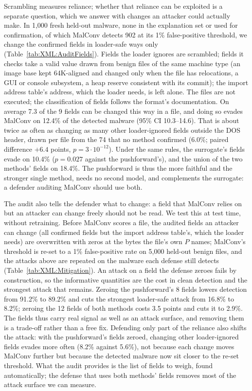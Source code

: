 Scrambling measures reliance; whether that reliance can be exploited is a separate question, which we answer with
changes an attacker could actually make. In 1{,}000 fresh held-out malware, none in the explanation set or used for
confirmation, of which MalConv detects 902 at its 1\% false-positive threshold, we change the confirmed fields in
loader-safe ways only (Table~\ref{tab:XML:AuditFields}). Fields the loader ignores are scrambled; fields it checks
take a valid value drawn from benign files of the same machine type (an image base kept 64K-aligned and changed only
when the file has relocations, a GUI or console subsystem, a heap reserve consistent with its commit); the import
address table's address, which the loader needs, is left alone. The files are not executed; the classification of
fields follows the format's documentation. On average 7.3 of the 9 fields can be changed this way in a file, and doing
so evades MalConv on 12.4\% of the detected malware (95\% CI 10.3--14.6). That is about twice as often as changing as
many other loader-ignored fields outside the DOS header, drawn per file from the 74 that no method confirmed (6.0\%;
paired difference $+6.4$ points, $p = 3 \cdot 10^{-12}$). Under the same rules, the surrogate's fields
evade on 10.4\% ($p = 0.027$ against the pushforward's), and the union of the two methods' fields on 18.4\%. The
pushforward is thus the more faithful and the stronger single method, needs no second model, and complements the
surrogate: a defender auditing MalConv should use both.

The audit also tells the defender what to change: a field that MalConv relies on but an attacker can change freely
should not be read. We test this at test time, without retraining. Before MalConv scores a file, the audited fields an
attacker can change (all confirmed fields but the import address table's, which the loader needs) are overwritten with
zeros at the bytes the file's own $P$ names; MalConv's threshold is re-set to a 1\% false-positive rate on 5{,}000
held-out benign files, and the attacks above are repeated on the malware each defense still detects
(Table~\ref{tab:XML:Mitigation}). An attack on a field the defense zeroes fails by construction, so the informative
quantities are the cost in clean detection and the strongest attack that remains. Zeroing the pushforward's 8 fields
lowers detection from 91.2\% to 89.2\% and cuts the strongest loader-safe attack from 16.8\% to 8.2\%; zeroing the 12
fields of both methods costs 3.5 points and cuts it to 2.9\%. The fields thus carry real signal as well as an attack
surface, and removing them is a trade-off rather than a free fix. Defending only part of the reliance also shifts the
attack: with the pushforward's fields zeroed, changing other loader-ignored fields evades more often (8.2\% against
5.6\%), not because each change moves MalConv further but because the detected malware now sit closer to the re-set
threshold. What the audit provides is the list of fields to weigh, found automatically; the defense that uses both
methods' fields removes most of the attack surface we can measure. 

